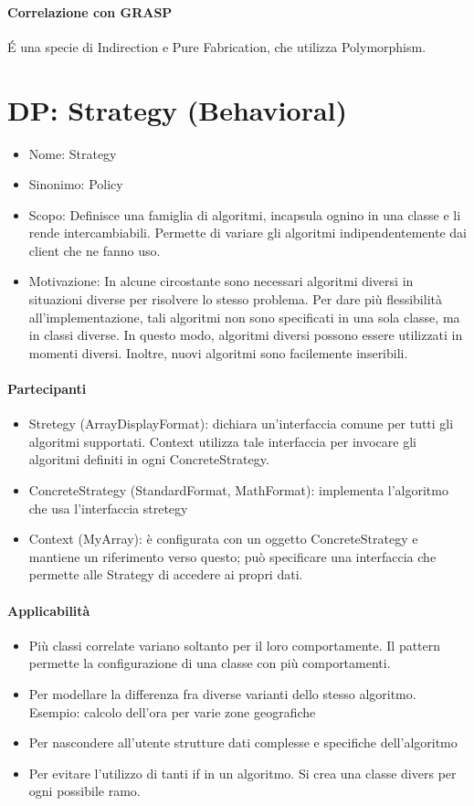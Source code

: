 \paragraph*{Correlazione con GRASP} \'E una specie di Indirection e Pure Fabrication, che utilizza Polymorphism.
\section{DP: Strategy (Behavioral)}
\begin{itemize}
    \item Nome: Strategy
    \item Sinonimo: Policy
    \item Scopo: Definisce una famiglia di algoritmi, incapsula ognino in una classe e li rende
    intercambiabili. Permette di variare gli algoritmi indipendentemente dai client che ne fanno uso.
    \item Motivazione: In alcune circostante sono necessari algoritmi diversi in situazioni diverse per
    risolvere lo stesso problema. Per dare più flessibilità all'implementazione, tali algoritmi non
    sono specificati in una sola classe, ma in classi diverse. In questo modo, algoritmi diversi possono
    essere utilizzati in momenti diversi. Inoltre, nuovi algoritmi sono facilemente inseribili.
\end{itemize}
\paragraph*{Partecipanti}
\begin{itemize}
    \item Stretegy (ArrayDisplayFormat): dichiara un'interfaccia comune per tutti gli algoritmi supportati.
    Context utilizza tale interfaccia per invocare gli algoritmi definiti in ogni ConcreteStrategy.
    \item ConcreteStrategy (StandardFormat, MathFormat): implementa l'algoritmo che usa l'interfaccia stretegy
    \item Context (MyArray): è configurata con un oggetto ConcreteStrategy e mantiene un riferimento verso
    questo; può specificare una interfaccia che permette alle Strategy di accedere ai propri dati.
\end{itemize}
\paragraph*{Applicabilità}
\begin{itemize}
    \item Più classi correlate variano soltanto per il loro comportamente. Il pattern permette
    la configurazione di una classe con più comportamenti.
    \item Per modellare la differenza fra diverse varianti dello stesso algoritmo. Esempio:
    calcolo dell'ora per varie zone geografiche
    \item Per nascondere all'utente strutture dati complesse e specifiche dell'algoritmo
    \item Per evitare l'utilizzo di tanti if in un algoritmo. Si crea una classe divers per ogni possibile ramo.
\end{itemize}
